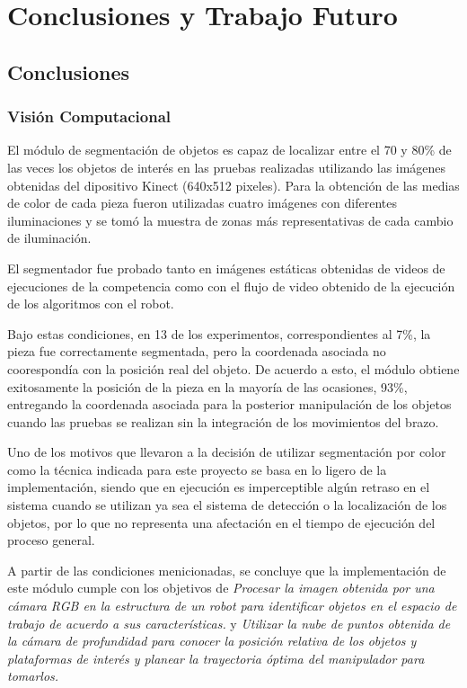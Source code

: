 \chapter{Conclusiones y Trabajo Futuro}
\section{Conclusiones}
\subsection{Visión Computacional}
El módulo de segmentación de objetos es capaz de localizar entre el 70 y 80\% de las veces los objetos de interés en las pruebas realizadas utilizando las imágenes obtenidas del dipositivo Kinect (640x512 pixeles). Para la obtención de las medias de color de cada pieza fueron utilizadas cuatro imágenes con diferentes iluminaciones y se tomó la muestra de zonas más representativas de cada cambio de iluminación.


El segmentador fue probado tanto en imágenes estáticas obtenidas de videos de ejecuciones de la competencia como con el flujo de video obtenido de la ejecución de los algoritmos con el robot.

Bajo estas condiciones, en 13 de los experimentos, correspondientes al 7\%, la pieza fue correctamente segmentada, pero la coordenada asociada no coorespondía con la posición real del objeto. De acuerdo a esto, el módulo obtiene exitosamente la posición de la pieza en la mayoría de las ocasiones, 93\%, entregando la coordenada asociada para la posterior manipulación de los objetos cuando las pruebas se realizan sin la integración de los movimientos del brazo.

Uno de los motivos que llevaron a la decisión de utilizar segmentación por color como la técnica indicada para este proyecto se basa en lo ligero de la implementación, siendo que en ejecución es imperceptible algún retraso en el sistema cuando se utilizan ya sea el sistema de detección o la localización de los objetos, por lo que no representa una afectación en el tiempo de ejecución del proceso general.\newpage

A partir de las condiciones menicionadas, se concluye que la implementación de este módulo cumple con los objetivos de \textit{Procesar la imagen obtenida por una cámara RGB en la estructura de un robot para identificar objetos en el espacio de trabajo de acuerdo a sus características.} y \textit{Utilizar la nube de puntos  obtenida de la cámara de profundidad para conocer la posición relativa de los objetos y plataformas de interés y planear la trayectoria óptima del manipulador para tomarlos.}

